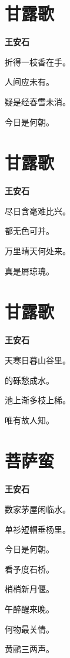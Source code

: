 \documentclass[12pt,a4paper]{ctexbook}
\begin{document}
\section{甘露歌}
\textbf{王安石}\par\vspace{0.5em}
折得一枝香在手。\par
人间应未有。\par
疑是经春雪未消。\par
今日是何朝。\par

\section{甘露歌}
\textbf{王安石}\par\vspace{0.5em}
尽日含毫难比兴。\par
都无色可并。\par
万里晴天何处来。\par
真是屑琼瑰。\par

\section{甘露歌}
\textbf{王安石}\par\vspace{0.5em}
天寒日暮山谷里。\par
的砾愁成水。\par
池上渐多枝上稀。\par
唯有故人知。\par

\section{菩萨蛮}
\textbf{王安石}\par\vspace{0.5em}
数家茅屋闲临水。\par
单衫短帽垂杨里。\par
今日是何朝。\par
看予度石桥。\par
梢梢新月偃。\par
午醉醒来晚。\par
何物最关情。\par
黄鹂三两声。\par
\end{document}

